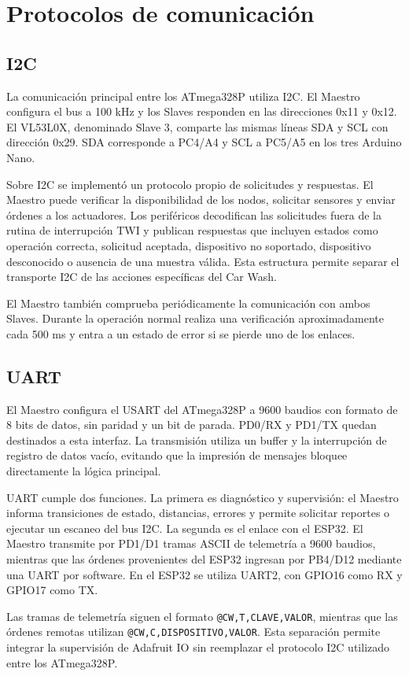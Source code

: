 \section{Protocolos de comunicación}

\subsection{I2C}
La comunicación principal entre los ATmega328P utiliza I2C. El Maestro configura el bus a 100 kHz y los Slaves responden en las direcciones 0x11 y 0x12. El VL53L0X, denominado Slave 3, comparte las mismas líneas SDA y SCL con dirección 0x29. SDA corresponde a PC4/A4 y SCL a PC5/A5 en los tres Arduino Nano.

Sobre I2C se implementó un protocolo propio de solicitudes y respuestas. El Maestro puede verificar la disponibilidad de los nodos, solicitar sensores y enviar órdenes a los actuadores. Los periféricos decodifican las solicitudes fuera de la rutina de interrupción TWI y publican respuestas que incluyen estados como operación correcta, solicitud aceptada, dispositivo no soportado, dispositivo desconocido o ausencia de una muestra válida. Esta estructura permite separar el transporte I2C de las acciones específicas del Car Wash.

El Maestro también comprueba periódicamente la comunicación con ambos Slaves. Durante la operación normal realiza una verificación aproximadamente cada 500 ms y entra a un estado de error si se pierde uno de los enlaces.

\subsection{UART}
El Maestro configura el USART del ATmega328P a 9600 baudios con formato de 8 bits de datos, sin paridad y un bit de parada. PD0/RX y PD1/TX quedan destinados a esta interfaz. La transmisión utiliza un buffer y la interrupción de registro de datos vacío, evitando que la impresión de mensajes bloquee directamente la lógica principal.

UART cumple dos funciones. La primera es diagnóstico y supervisión: el Maestro informa transiciones de estado, distancias, errores y permite solicitar reportes o ejecutar un escaneo del bus I2C. La segunda es el enlace con el ESP32. El Maestro transmite por PD1/D1 tramas ASCII de telemetría a 9600 baudios, mientras que las órdenes provenientes del ESP32 ingresan por PB4/D12 mediante una UART por software. En el ESP32 se utiliza UART2, con GPIO16 como RX y GPIO17 como TX.

Las tramas de telemetría siguen el formato \texttt{@CW,T,CLAVE,VALOR}, mientras que las órdenes remotas utilizan \texttt{@CW,C,DISPOSITIVO,VALOR}. Esta separación permite integrar la supervisión de Adafruit IO sin reemplazar el protocolo I2C utilizado entre los ATmega328P.
